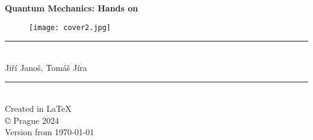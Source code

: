 \begin{titlepage}
\begin{center}
\vspace*{2cm}
{\Huge \textbf{Quantum Mechanics: Hands on}}

\bigskip

\begin{figure} [H]
\centering
\texttt{[image: cover2.jpg]}
\end{figure}
\rule{0.8\textwidth}{0.02cm}\\

Jiří Janoš, Tomáš Jíra\\

\end{center}
\vfill
\begin{flushright}
\rule{3cm}{0.01cm} \\
Created in \LaTeX \\
\copyright \hspace{0.1cm} Prague 2024 \\
Version from \today
\end{flushright}
\end{titlepage}